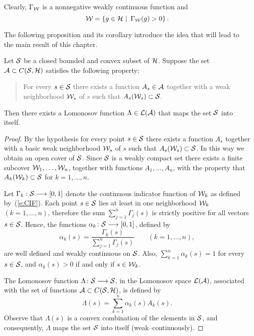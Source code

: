 \medskip

\begin{rem}
Clearly, $\Gamma_{\cal W}$ is a nonnegative weakly continuous function and
\[ {\cal W} = \left\{g\in{\cal H}\,\,|\,\,\,\Gamma_{\cal W}(g)>0\right\}. \]
\end{rem}

\bigskip

The following proposition and its corollary introduce the idea that will lead
to the main result of this chapter.

\medskip

\goodbreak
\newpage

\begin{prop} \label{p:wAPPROX}
Let ${\cal S}$ be a closed bounded and convex subset of ${\cal H}$. Suppose the set
${\cal A}\subset{}C({\cal S},{\cal H})$ satisfies the following property:
\begin{quote}
  {For every $s\in{\cal S}$ there exists a function $A_s\in{\cal A}$ together with a
  weak neighborhood ${\cal W}_s$ of $s$ such that $A_s({\cal W}_s)\subset{\cal S}$.}
\end{quote}
Then there exists a Lomonosov function $\Lambda\in\cal{L}({\cal A})$ that maps the
set ${\cal S}$ into itself.
\end{prop}

\begin{proof}
By the hypothesis for every point $s\in{\cal S}$ there exists a function $A_s$
together with a basic weak neighborhood ${\cal W}_s$ of $s$ such that
$A_s({\cal W}_s)\subset{\cal S}$. In this way we obtain an open cover of ${\cal S}$. Since ${\cal S}$
is a weakly compact set there exists a finite subcover ${\cal W}_1,\ldots,{\cal W}_n$,
together with functions $A_1,\ldots,A_n$, with the property that
$A_k({\cal W}_k)\subset{\cal S}$ for $k=1,\ldots,n$.

Let $\Gamma_k:{\cal S}\longrightarrow[0,1]$ denote the continuous indicator function of ${\cal W}_k$
as defined by~(\ref{e:CIF}). Each point $s\in{\cal S}$ lies at least in one
neighborhood ${\cal W}_k$ $(k=1,\ldots,n)$, therefore the sum
$\sum_{j=1}^n\Gamma_j(s)$ is strictly positive for all vectors $s\in{\cal S}$.
Hence, the functions $\alpha_k\colon{\cal S}\longrightarrow[0,1]$, defined by
\[ \alpha_k(s) =
   \frac{\Gamma_k(s)}{\sum_{j=1}^n \Gamma_j(s)}
   \quad\quad   (k=1,\ldots,n), \]
are well defined and weakly continuous on ${\cal S}$. Also,
$\sum_{k=1}^n\alpha_k(s)=1$ for every $s\in{\cal S}$, and $\alpha_k(s)>0$ if and
only if $s\in{\cal W}_k$.

\smallskip

The Lomonosov function $\Lambda\colon{\cal S}\longrightarrow{\cal S}$, in the Lomonosov space
$\cal{L}({\cal A})$, associated with the set of functions ${\cal A}\subset{}C({\cal S},{\cal H})$, is
defined by
\[ \Lambda(s) = \sum_{k=1}^n \alpha_k(s) A_k(s). \]
Observe that $\Lambda(s)$ is a convex combination of the elements in ${\cal S}$,
and consequently, $\Lambda$ maps the set ${\cal S}$ into itself
(weak--continuously).
\end{proof}

